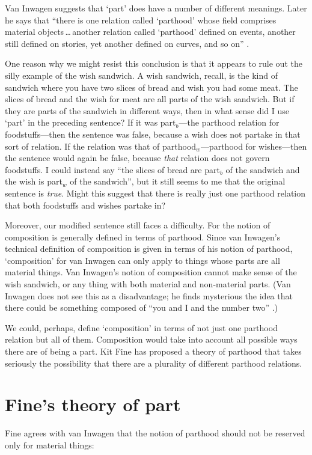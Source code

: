 \documentclass[11pt]{article}
\begin{document}
\begin{spacing}{1.25}
Van Inwagen suggests that `part' does have a number of different
meanings.  Later he says that ``there is one relation called
`parthood' whose field comprises material objects\,\ldots\,another
relation called `parthood' defined on events, another still defined on
stories, yet another defined on curves, and so on''
\citeyearpar[19]{inwagen1995}.

One reason why we might resist this conclusion is that it appears to
rule out the silly example of the wish sandwich.  A wish sandwich,
recall, is the kind of sandwich where you have two slices of bread and
wish you had some meat.  The slices of bread and the wish for meat are
all parts of the wish sandwich.  But if they are parts of the sandwich
in different ways, then in what sense did I use `part' in the
preceding sentence?  If it was part$_b$---the parthood relation for
foodstuffs---then the sentence was false, because a wish does not
partake in that sort of relation.  If the relation was that of
parthood$_w$---parthood for wishes---then the sentence would again be
false, because {\em that} relation does not govern foodstuffs.  I
could instead say ``the slices of bread are part$_b$ of the sandwich
and the wish is part$_w$ of the sandwich'', but it still seems to me
that the original sentence is {\em true}.  Might this suggest that
there is really just one parthood relation that both foodstuffs and
wishes partake in?

Moreover, our modified sentence still faces a difficulty.  For the
notion of composition is generally defined in terms of parthood.
Since van Inwagen's technical definition of composition is given in
terms of his notion of parthood, `composition' for van Inwagen can
only apply to things whose parts are all material things.  Van
Inwagen's notion of composition cannot make sense of the wish
sandwich, or any thing with both material and non-material parts.
(Van Inwagen does not see this as a disadvantage; he finds mysterious
the idea that there could be something composed of ``you and I and the
number two'' \citeyearpar[20]{inwagen1995}.)

We could, perhaps, define `composition' in terms of not just one
parthood relation but all of them.  Composition would take into
account all possible ways there are of being a part.  Kit Fine has
proposed a theory of parthood that takes seriously the possibility
that there are a plurality of different parthood relations.

\section{Fine's theory of part}
\label{fine}
Fine agrees with van Inwagen that the notion of parthood should not be
reserved only for material things:


\end{spacing}
\end{document}
